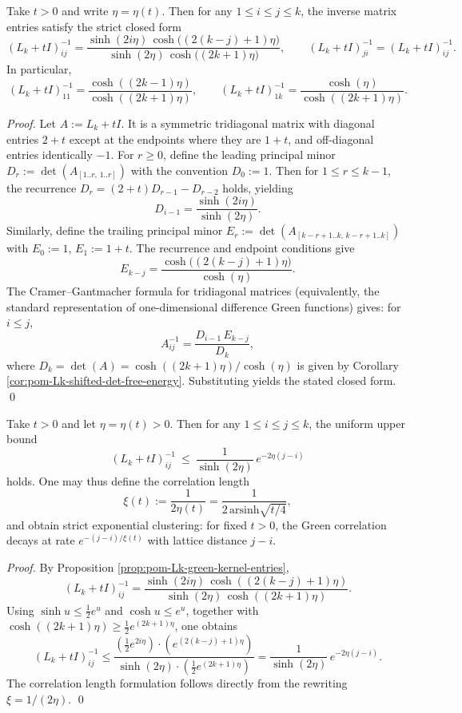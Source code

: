 \begin{proposition}\label{prop:pom-Lk-green-kernel-entries}
Take \(t>0\) and write \(\eta=\eta(t)\).
Then for any \(1\le i\le j\le k\), the inverse matrix entries satisfy the strict closed form
\[
(L_k+tI)^{-1}_{ij}
=\frac{\sinh(2i\eta)\,\cosh\!\bigl((2(k-j)+1)\eta\bigr)}
{\sinh(2\eta)\,\cosh\!\bigl((2k+1)\eta\bigr)},
\qquad
(L_k+tI)^{-1}_{ji}=(L_k+tI)^{-1}_{ij}.
\]
In particular,
\[
(L_k+tI)^{-1}_{11}=\frac{\cosh((2k-1)\eta)}{\cosh((2k+1)\eta)},
\qquad
(L_k+tI)^{-1}_{1k}=\frac{\cosh(\eta)}{\cosh((2k+1)\eta)}.
\]
\end{proposition}
\begin{proof}
Let \(A:=L_k+tI\). It is a symmetric tridiagonal matrix with diagonal entries \(2+t\) except at the endpoints where they are \(1+t\), and off-diagonal entries identically \(-1\).
For \(r\ge 0\), define the leading principal minor
\(
D_r:=\det(A_{[1..r,\,1..r]})
\)
with the convention \(D_0:=1\). Then for \(1\le r\le k-1\), the recurrence \(D_r=(2+t)D_{r-1}-D_{r-2}\) holds, yielding
\[
D_{i-1}=\frac{\sinh(2i\eta)}{\sinh(2\eta)}.
\]
Similarly, define the trailing principal minor
\(
E_r:=\det(A_{[k-r+1..k,\,k-r+1..k]})
\)
with \(E_0:=1\), \(E_1:=1+t\). The recurrence and endpoint conditions give
\[
E_{k-j}=\frac{\cosh\!\bigl((2(k-j)+1)\eta\bigr)}{\cosh(\eta)}.
\]
The Cramer--Gantmacher formula for tridiagonal matrices (equivalently, the standard representation of one-dimensional difference Green functions) gives: for \(i\le j\),
\[
A^{-1}_{ij}=\frac{D_{i-1}\,E_{k-j}}{D_k},
\]
where \(D_k=\det(A)=\cosh((2k+1)\eta)/\cosh(\eta)\) is given by Corollary \ref{cor:pom-Lk-shifted-det-free-energy}.
Substituting yields the stated closed form. \qed
\end{proof}

\begin{corollary}\label{cor:pom-Lk-exponential-clustering-gaplaw}
Take \(t>0\) and let \(\eta=\eta(t)>0\). Then for any \(1\le i\le j\le k\), the uniform upper bound
\[
(L_k+tI)^{-1}_{ij}\ \le\ \frac{1}{\sinh(2\eta)}\,e^{-2\eta(j-i)}
\]
holds. One may thus define the correlation length
\[
\xi(t):=\frac{1}{2\eta(t)}=\frac{1}{2\,\mathrm{arsinh}\sqrt{t/4}},
\]
and obtain strict exponential clustering: for fixed \(t>0\), the Green correlation decays at rate \(e^{-(j-i)/\xi(t)}\) with lattice distance \(j-i\).
\end{corollary}
\begin{proof}
By Proposition \ref{prop:pom-Lk-green-kernel-entries},
\[
(L_k+tI)^{-1}_{ij}
=\frac{\sinh(2i\eta)\,\cosh((2(k-j)+1)\eta)}{\sinh(2\eta)\,\cosh((2k+1)\eta)}.
\]
Using \(\sinh u\le \tfrac12 e^{u}\) and \(\cosh u\le e^{u}\), together with \(\cosh((2k+1)\eta)\ge \tfrac12 e^{(2k+1)\eta}\), one obtains
\[
(L_k+tI)^{-1}_{ij}
\le
\frac{(\tfrac12 e^{2i\eta})\cdot (e^{(2(k-j)+1)\eta})}{\sinh(2\eta)\cdot (\tfrac12 e^{(2k+1)\eta})}
=\frac{1}{\sinh(2\eta)}\,e^{-2\eta(j-i)}.
\]
The correlation length formulation follows directly from the rewriting \(\xi=1/(2\eta)\). \qed
\end{proof}

